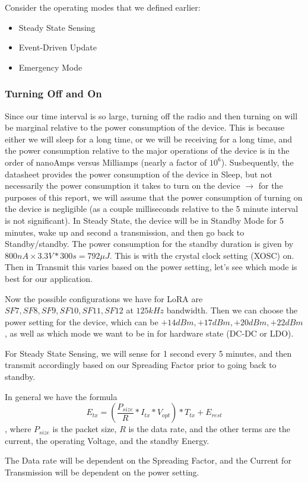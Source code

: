 Consider the operating modes that we defined earlier: 
\begin{itemize}
    \item Steady State Sensing
    \item Event-Driven Update
    \item Emergency Mode
\end{itemize}
\subsubsection{Turning Off and On}
Since our time interval is so large, turning off the radio and then turning on will be marginal relative to the power consumption of the device. This is because either we will sleep for a long time, or we will be receiving for a long time, and the power consumption relative to the major operations of the device is in the order of nanoAmps versus Milliamps (nearly a factor of $10^6$). Susbequently, the datasheet provides the power consumption of the device in Sleep, but not necessarily the power consumption it takes to turn on the device $\rightarrow$ for the purposes of this report, we will assume that the power consumption of turning on the device is negligible (as a couple milliseconds relative to the 5 minute interval is not significant). 
In Steady State, the device will be in Standby Mode for 5 minutes, wake up and second a transmission, and then go back to Standby/standby. The power consumption for the standby duration is given by $800 nA \times 3.3 V * 300 s = 792\mu J$. This is with the crystal clock setting (XOSC) on. Then in Transmit this varies based on the power setting, let's see which mode is best for our application. 

Now the possible configurations we have for LoRA are 
$SF7, SF8, SF9, SF10, SF11, SF12$ at $125 kHz$ bandwidth. Then we can choose the power setting for the device, which can be $+14 dBm, +17 dBm, +20 dBm, +22 dBm$, as well as which mode we want to be in for hardware state (DC-DC or LDO).

For Steady State Sensing, we will sense for 1 second every 5 minutes, and then transmit accordingly based on our Spreading Factor prior to going back to standby. 

In general we have the formula $$E_{tx} = (\frac{P_{size}}{R} * I_{tx} * V_{opt}) * T_{tx} + E_{rest}$$, where $P_{size}$ is the packet size, $R$ is the data rate, and the other terms are the current, the operating Voltage, and the standby Energy. 

The Data rate will be dependent on the Spreading Factor, and the Current for Transmission will be dependent on the power setting.
